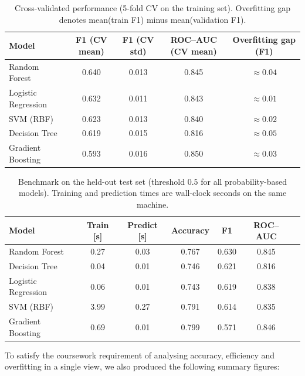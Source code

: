 \documentclass[11pt,a4paper]{article}
\begin{document}
\begin{table}[h]
    \centering
    \small
    \begin{tabular}{@{}lcccc@{}}
        \toprule
        \textbf{Model} & \textbf{F1 (CV mean)} & \textbf{F1 (CV std)} & \textbf{ROC--AUC (CV mean)} & \textbf{Overfitting gap (F1)} \\
        \midrule
        Random Forest      & 0.640 & 0.013 & 0.845 & $\approx 0.04$ \\
        Logistic Regression & 0.632 & 0.011 & 0.843 & $\approx 0.01$ \\
        SVM (RBF)          & 0.623 & 0.013 & 0.840 & $\approx 0.02$ \\
        Decision Tree      & 0.619 & 0.015 & 0.816 & $\approx 0.05$ \\
        Gradient Boosting  & 0.593 & 0.016 & 0.850 & $\approx 0.03$ \\
        \bottomrule
    \end{tabular}
    \caption{Cross-validated performance (5-fold CV on the training set). Overfitting gap denotes mean(train F1) minus mean(validation F1).}
    \label{tab:cv-results}
\end{table}

\begin{table}[h]
    \centering
    \small
    \begin{tabular}{@{}lcccccc@{}}
        \toprule
        \textbf{Model} & \textbf{Train [s]} & \textbf{Predict [s]} & \textbf{Accuracy} & \textbf{F1} & \textbf{ROC--AUC} \\
        \midrule
        Random Forest      & 0.27 & 0.03 & 0.767 & 0.630 & 0.845 \\
        Decision Tree      & 0.04 & 0.01 & 0.746 & 0.621 & 0.816 \\
        Logistic Regression & 0.06 & 0.01 & 0.743 & 0.619 & 0.838 \\
        SVM (RBF)          & 3.99 & 0.27 & 0.791 & 0.614 & 0.835 \\
        Gradient Boosting  & 0.69 & 0.01 & 0.799 & 0.571 & 0.846 \\
        \bottomrule
    \end{tabular}
    \caption{Benchmark on the held-out test set (threshold $0.5$ for all probability-based models). Training and prediction times are wall-clock seconds on the same machine.}
    \label{tab:test-benchmark}
\end{table}

\vspace{0.4em}
\noindent
To satisfy the coursework requirement of analysing accuracy, efficiency and overfitting in a single view, we also produced the following summary figures:
\end{document}
